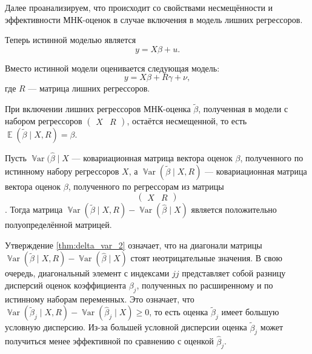 \documentclass[12pt]{article}
\DeclareMathOperator{\Var}{\mathbb{V}ar}
\DeclareMathOperator{\E}{\mathbb{E}}
\renewcommand{\b}{\beta}
\newcommand{\hb}{\hat{\beta}}
\newcommand{\tb}{\tilde{\beta}}
\begin{document}
Далее проанализируем, что происходит со свойствами несмещённости и эффективности МНК-оценок в случае включения в модель лишних регрессоров.

Теперь истинной моделью является
\[
y = X\b + u.
\]

Вместо истинной модели оценивается следующая модель:
\[
y = X\b + R\gamma + \nu,
\]
где $R$ — матрица лишних регрессоров.

\begin{lemma}
При включении лишних регрессоров МНК-оценка $\tb$, полученная в модели с набором регрессоров 
$\begin{pmatrix} X & R\end{pmatrix}$, 
остаётся несмещенной, то есть $\E(\tb \mid X, R) = \b$.
\end{lemma}

\begin{lemma}
\label{thm:delta_var_2}
Пусть $\Var(\hb \mid X$ — ковариационная матрица вектора оценок $\beta$, полученного по истинному набору регрессоров $X$, а $\Var(\tb \mid X,R)$ — ковариационная матрица вектора оценок $\beta$, полученного по регрессорам  из матрицы $$\begin{pmatrix} X & R\end{pmatrix}$$. 
Тогда матрица $\Var(\tb \mid X, R) - \Var(\hb \mid X)$ является положительно полуопределённой матрицей.
\end{lemma}

Утверждение \ref{thm:delta_var_2} означает, что на диагонали матрицы $\Var(\tb \mid X, R) - \Var(\hb \mid X)$ стоят неотрицательные значения. 
В свою очередь, диагональный элемент с индексами ${jj}$ представляет собой разницу дисперсий оценок коэффициента $\b_j$, полученных по расширенному и по истинному наборам переменных. 
Это означает, что $\Var(\tb_j \mid X, R) - \Var(\hb_j \mid X) \geq 0$, то есть оценка $\tb_j$ имеет большую условную дисперсию. 
Из-за большей условной дисперсии оценка $\tb_j$ может получиться менее эффективной по сравнению с оценкой $\hb_j$.
\end{document}
